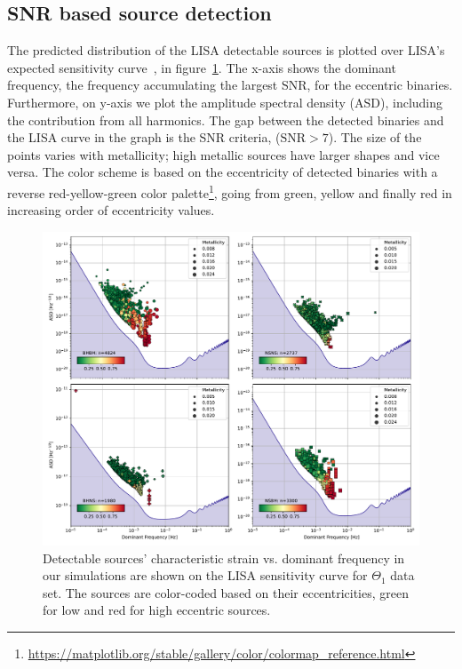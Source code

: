 \documentclass[twocolumn, twocolappendix]{aastex63}
\begin{document}
\subsection{SNR based source detection}
\label{subsec:snr-based-source-detection}
The predicted distribution of the LISA detectable sources is plotted over LISA's expected sensitivity curve~\citep{Robson2019}, in figure~\ref{fig:alldcosnrplotting}.
The x-axis shows the dominant frequency, the frequency accumulating the largest SNR, for the eccentric binaries.
Furthermore, on y-axis we plot the amplitude spectral density (ASD), including the contribution from all harmonics.
The gap between the detected binaries and the LISA curve in the graph is the SNR criteria, ($\text{SNR}>7$).
The size of the points varies with metallicity; high metallic sources have larger shapes and vice versa.
The color scheme is based on the eccentricity of detected binaries with a reverse red-yellow-green color palette\footnote{\url{https://matplotlib.org/stable/gallery/color/colormap_reference.html}}, going from green, yellow and finally red in increasing order of eccentricity values.

\begin{figure}[!htb]%
	\centering
	\includegraphics[width=\columnwidth]{analysis_data/004__images_for_latex/dco_typewise_snr}
	\caption{Detectable sources' characteristic strain vs. dominant frequency in our simulations are shown on the LISA sensitivity curve for $\Theta_1$ data set. The sources are color-coded based on their eccentricities, green for low and red for high eccentric sources.}
	\label{fig:alldcosnrplotting}
\end{figure}
\end{document}
